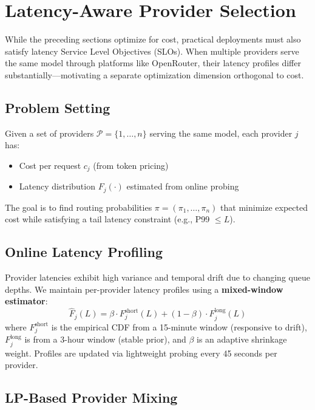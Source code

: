 \section{Latency-Aware Provider Selection}
\label{sec:latency}

While the preceding sections optimize for cost, practical deployments must also satisfy latency Service Level Objectives (SLOs). When multiple providers serve the same model through platforms like OpenRouter, their latency profiles differ substantially---motivating a separate optimization dimension orthogonal to cost.

\subsection{Problem Setting}

Given a set of providers $\mathcal{P} = \{1, \ldots, n\}$ serving the same model, each provider $j$ has:
\begin{itemize}
    \item Cost per request $c_j$ (from token pricing)
    \item Latency distribution $F_j(\cdot)$ estimated from online probing
\end{itemize}

The goal is to find routing probabilities $\pi = (\pi_1, \ldots, \pi_n)$ that minimize expected cost while satisfying a tail latency constraint (e.g., P99 $\leq L$).

\subsection{Online Latency Profiling}

Provider latencies exhibit high variance and temporal drift due to changing queue depths. We maintain per-provider latency profiles using a \textbf{mixed-window estimator}:
\begin{equation}
    \hat{F}_j(L) = \beta \cdot F_j^{\text{short}}(L) + (1 - \beta) \cdot F_j^{\text{long}}(L)
\end{equation}
where $F_j^{\text{short}}$ is the empirical CDF from a 15-minute window (responsive to drift), $F_j^{\text{long}}$ is from a 3-hour window (stable prior), and $\beta$ is an adaptive shrinkage weight. Profiles are updated via lightweight probing every 45 seconds per provider.

\subsection{LP-Based Provider Mixing}

